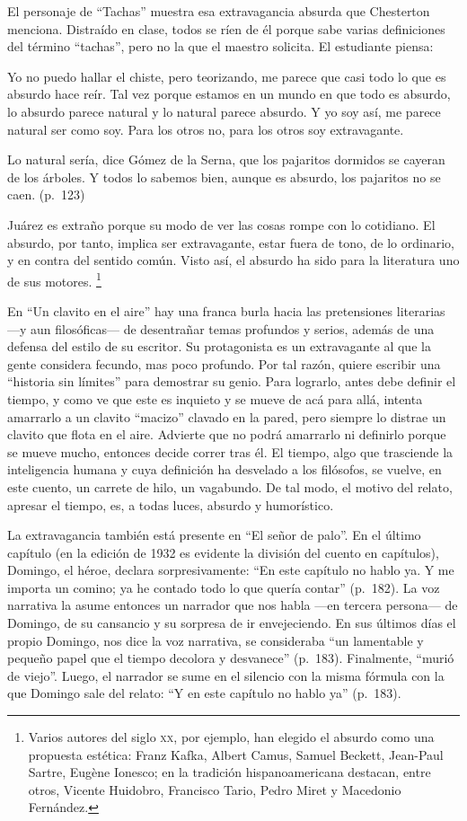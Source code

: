 \documentclass[14pt,twoside,final]{extbook} %
\let\oldfootnote\footnote
\renewcommand\footnote[1]{%
\oldfootnote{\hspace{1mm}#1}}
\begin{document}
El personaje de ``Tachas'' muestra esa extravagancia absurda que Chesterton menciona. Distraído en clase, todos se ríen de él porque sabe varias definiciones del término ``tachas'', pero no la que el maestro solicita. El estudiante piensa:
\begin{quoting}
Yo no puedo hallar el chiste, pero teorizando, me parece que casi todo lo que es absurdo hace reír. Tal vez porque estamos en un mundo en que todo es absurdo, lo absurdo parece natural y lo natural parece absurdo. Y yo soy así, me parece natural ser como soy. Para los otros no, para los otros soy extravagante.

Lo natural sería, dice Gómez de la Serna, que los pajaritos dormidos se cayeran de los árboles. Y todos lo sabemos bien, aunque es absurdo, los pajaritos no se caen. (p.~123)
\end{quoting}
Juárez es extraño porque su modo de ver las cosas rompe con lo cotidiano. El absurdo, por tanto, implica ser extravagante, estar fuera de tono, de lo ordinario, y en contra del sentido común. Visto así, el absurdo ha sido para la literatura uno de sus motores.\footnote{Varios autores del siglo \textsc{xx}, por ejemplo, han elegido el absurdo como una propuesta estética: Franz Kafka, Albert Camus, Samuel Beckett, Jean-Paul Sartre, Eugène Ionesco; en la tradición hispanoamericana destacan, entre otros, Vicente Huidobro, Francisco Tario, Pedro Miret y Macedonio Fernández.}

En ``Un clavito en el aire'' hay una franca burla hacia las pretensiones literarias ---y aun filosóficas--- de desentrañar temas profundos y serios, además de una defensa del estilo de su escritor. Su protagonista es un extravagante al que la gente considera fecundo, mas poco profundo. Por tal razón, quiere escribir una ``historia sin límites'' para demostrar su genio. Para lograrlo, antes debe definir el tiempo, y como ve que este es inquieto y se mueve de acá para allá, intenta amarrarlo a un clavito ``macizo'' clavado en la pared, pero siempre lo distrae un clavito que flota en el aire. Advierte que no podrá amarrarlo ni definirlo porque se mueve mucho, entonces decide correr tras él. El tiempo, algo que trasciende la inteligencia humana y cuya definición ha desvelado a los filósofos, se vuelve, en este cuento, un carrete de hilo, un vagabundo. De tal modo, el motivo del relato, apresar el tiempo, es, a todas luces, absurdo y humorístico.

La extravagancia también está presente en ``El señor de palo''. En el último capítulo (en la edición de 1932 es evidente la división del cuento en capítulos), Domingo, el héroe, declara sorpresivamente: ``En este capítulo no hablo ya. Y me importa un comino; ya he contado todo lo que quería contar'' (p.~182). La voz narrativa la asume entonces un narrador que nos habla ---en tercera persona--- de Domingo, de su cansancio y su sorpresa de ir envejeciendo. En sus últimos días el propio Domingo, nos dice la voz narrativa, se consideraba ``un lamentable y pequeño papel que el tiempo decolora y desvanece'' (p.~183). Finalmente, ``murió de viejo''. Luego, el narrador se sume en el silencio con la misma fórmula con la que Domingo sale del relato: ``Y en este capítulo no hablo ya'' (p.~183).
\end{document}
